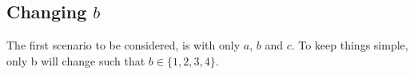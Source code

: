 \subsection{Changing $b$}
The first scenario to be considered, is with only $a$, $b$ and $c$.
To keep things simple, only b will change such that $b\in \{1,2,3,4\}$.
\begin{figure}[H]
    \centering
    \\

\end{figure}
